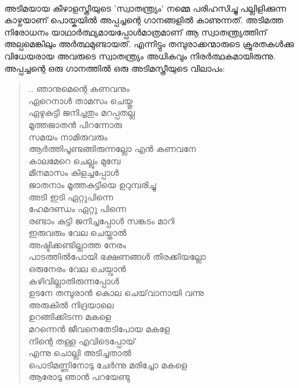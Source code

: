 \label{ch2box8} %
\begin{tcolorbox}[%
 breakable, %
  arc=0mm, 
  left=1pt, right = 1pt, 
  boxrule=0mm,
  colback = {blue!10}, %
] 

\paragraph{}
അടിമയായ കീഴാളസ്ത്രീയുടെ 'സ്വാതന്ത്ര്യം' നമ്മെ പരിഹസിച്ചു പല്ലിളിക്കുന്ന കാഴ്ചയാണ് പൊയ്കയിൽ അപ്പച്ചന്റെ ഗാനങ്ങളിൽ കാണുന്നത്. അടിമത്ത നിരോധനം യാഥാർത്ഥ്യമായപ്പോൾമാത്രമാണ് ആ സ്വാതന്ത്ര്യത്തിന് അല്പമെങ്കിലും അർത്ഥമുണ്ടായത്. എന്നിട്ടും തമ്പുരാക്കന്മാരുടെ ക്രൂരതകൾക്കു വിധേയരായ അവരുടെ സ്വാതന്ത്ര്യം അധികവും നിരർത്ഥകമായിരുന്നു. അപ്പച്ചന്റെ ഒരു ഗാനത്തിൽ ഒരു അടിമസ്ത്രീയുടെ വിലാപം:\\
\begin{quote}
.. ഞാനുമെന്റെ കണവനും\\
ഏറെനാൾ താമസം ചെയ്തു\\
ഏഴുകുട്ടി ജനിച്ചതും മറപ്പതല്ല\\
മൂത്തജാതൻ പിറന്നോരു\\
സമയം നാമിരുവരും\\
ആർത്തിപൂണ്ടങ്ങിരുന്നല്ലോ എൻ കണവനേ\\
കാലമേറെ ചെല്ലും മുമ്പേ\\
മീനമാസം കിളച്ചപ്പോൾ\\
ജാതനാം മൂത്തകുട്ടിയെ ഉറുമ്പരിച്ചു\\
അടി ഇടി ഏറ്റുപിന്നെ\\
ഹേമദണ്ഡം ഏറ്റു പിന്നെ\\
രണ്ടാം കുട്ടി ജനിച്ചപ്പോൾ സങ്കടം മാറി\\
ഇരുവരും വേല ചെയ്താൽ\\
അഷ്ടിക്കണ്ടില്ലാത്ത നേരം\\
പാടത്തിൽപോയി ഭക്ഷണങ്ങൾ തിരക്കിയല്ലോ\\
ഒരുനേരം വേല ചെയ്വാൻ\\
കഴിവില്ലാതിരുന്നപ്പോൾ\\
ഉടനേ തമ്പുരാൻ കൊല ചെയ്‌വാനായി വന്നു\\
അരുകിൽ നിദ്രയാലെ\\
ഉറങ്ങിക്കിടന്ന മകളെ\\
മറന്നെൻ ജീവനെതേടിപോയ മകളേ\\
നിന്റെ തള്ള എവിടെപ്പോയ്\\
എന്നു ചൊല്ലി അടിച്ചതാൽ\\
പൊടിമണ്ണിനോടു ചേർന്നു മരിച്ചോ മകളെ\\
ആരോടു ഞാൻ പറയേണ്ടു\\

\end{quote}
\end{tcolorbox}
